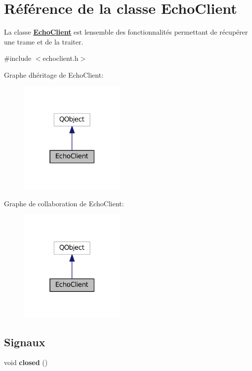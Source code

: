 \hypertarget{classEchoClient}{}\section{Référence de la classe Echo\+Client}
\label{classEchoClient}


La classe {\bfseries \hyperlink{classEchoClient}{Echo\+Client}} est l\textquotesingle{}ensemble des fonctionnalités permettant de récupérer une trame et de la traiter.  




{\ttfamily \#include $<$echoclient.\+h$>$}



Graphe d\textquotesingle{}héritage de Echo\+Client\+:\nopagebreak
\begin{figure}[H]
\begin{center}
\leavevmode
\includegraphics[width=147pt]{classEchoClient__inherit__graph}
\end{center}
\end{figure}


Graphe de collaboration de Echo\+Client\+:\nopagebreak
\begin{figure}[H]
\begin{center}
\leavevmode
\includegraphics[width=147pt]{classEchoClient__coll__graph}
\end{center}
\end{figure}
\subsection*{Signaux}
\begin{DoxyCompactItemize}
\item 
void {\bfseries closed} ()\hypertarget{classEchoClient_a0834d7f65bf0ed5411573ef34bf638e7}{}\label{classEchoClient_a0834d7f65bf0ed5411573ef34bf638e7}

\end{DoxyCompactItemize}
